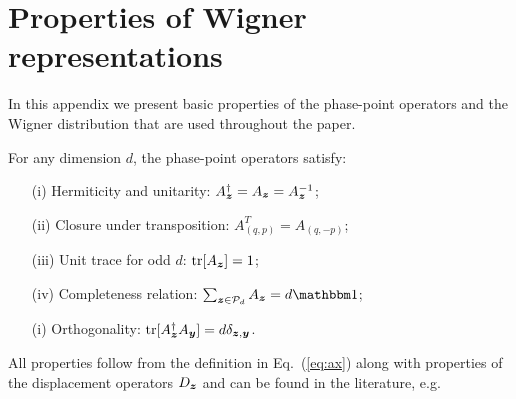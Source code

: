 \documentclass[pra,
aps,
twocolumn,
superscriptaddress,
groupedaddress,
nofootinbib,
reprint
]{revtex4-1}
\begin{document}
\appendix
\newpage
\section{Properties of Wigner representations}
\label{app:wigner}

In this appendix we present basic properties of the phase-point operators and the Wigner distribution that are used throughout the paper.

\begin{proposition}\label{thm:aproperties}
    For any dimension $d$, the phase-point operators satisfy:
    \begin{enumerate}
        \item[(i)]\label{en:a1} Hermiticity and unitarity: $A_{\bm{z}}^\dagger = A_{\bm{z}} = A_{\bm{z}}^{-1}$;
	    \item[(ii)]\label{en:a2} Closure under transposition: $A_{(q, p)}^T = A_{(q, -p)}$;
	    \item[(iii)]\label{en:a3} Unit trace for odd $d$: $\mbox{tr}[A_{\bm{z}}] = 1$;
	    \item[(iv)]\label{en:a4} Completeness relation: $\sum_{\bmz \in \cal{P}_d} A_{\bmz} = d\id$;
	    \item[(i)]\label{en:a5} Orthogonality: $\mbox{tr}[A_{\bm{z}}^\dagger A_{\bm{y}}] = d \delta_{\bm{z},\bm{y}}$.
	\end{enumerate}
\end{proposition}
All properties follow from the definition in Eq.~(\ref{eq:ax}) along with properties of the displacement operators $D_{\bm{z}}$ and can be found in the literature, e.g.~\cite{cit:veitch,Vourdas_2004,cit:gross3}
\end{document}
